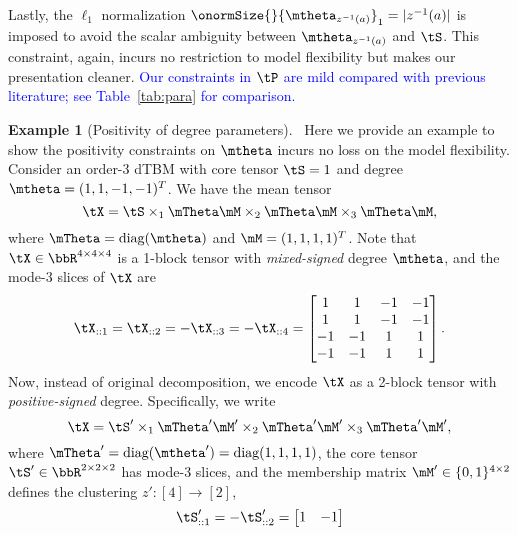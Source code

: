 \documentclass[lettersize,onecolumn,journal]{IEEEtran}
\theoremstyle{definition}
\theoremstyle{definition}
\newtheorem{example}{Example}
\begin{document}
Lastly, the $\ell_1$ normalization $\onormSize{}{\mtheta_{z^{-1}(a)}}_1=|z^{-1}(a)|$ is imposed to avoid the scalar ambiguity between $\mtheta_{z^{-1}(a)}$ and $\tS$. This constraint, again, incurs no restriction to model flexibility but makes our presentation cleaner. \textcolor{blue}{Our constraints in $\tP$ are mild compared with previous literature; see Table~\ref{tab:para} for comparison.} 

\begin{example}[Positivity of degree parameters]~\label{ex:positive}
Here we provide an example to show the positivity constraints on $\mtheta$ incurs no loss on the model flexibility. 
Consider an order-3 dTBM with core tensor $\tS = 1$ and degree $\mtheta = (1,1,-1, -1)^T$. We have the mean tensor 
\begin{equation}
    \tX = \tS \times_1 \mTheta \mM \times_2 \mTheta \mM \times_3 \mTheta \mM,
\end{equation}
where $\mTheta = \text{diag}(\mtheta)$ and $\mM = (1,1,1,1)^T$. Note that $\tX \in \bbR^{4 \times 4 \times 4}$ is a 1-block tensor with \emph{mixed-signed} degree $\mtheta$, and the mode-3 slices of $\tX$ are
\begin{equation}
    \tX_{::1} = \tX_{::2} = - \tX_{::3} = -\tX_{::4}  = \begin{bmatrix}
    1 & 1& -1& -1 \\
    1 & 1& -1& -1 \\
    -1& -1&1 & 1\\
     -1& -1&1 & 1
    \end{bmatrix}.
\end{equation}
Now, instead of original decomposition, we encode $\tX$ as a 2-block tensor with \emph{positive-signed} degree. Specifically, we write
\begin{equation}
     \tX = \tS' \times_1 \mTheta' \mM' \times_2 \mTheta' \mM'  \times_3 \mTheta' \mM' , 
\end{equation}
where $\mTheta' = \text{diag}(\mtheta') = \text{diag}(1,1, 1, 1)$, the core tensor $\tS' \in \bbR^{2 \times 2 \times 2}$ has mode-3 slices, and the membership matrix $\mM'\in\{0,1\}^{4\times 2}$ defines the clustering $z'\colon[4]\to[2]$,
\begin{equation}
    \tS'_{::1} = -\tS'_{::2} = \begin{bmatrix}
    1 & -1 \\

\end{bmatrix}
\end{equation}
\end{example}
\end{document}

